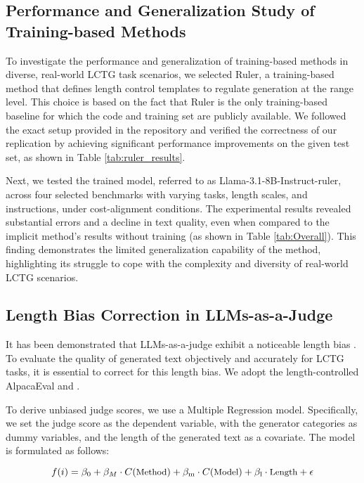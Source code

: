 \subsection{Performance and Generalization Study of Training-based Methods}
\label{sec:Training-based methods performance}
To investigate the performance and generalization of training-based methods in diverse, real-world LCTG task scenarios, we selected Ruler, a training-based method that defines length control templates to regulate generation at the range level. This choice is based on the fact that Ruler is the only training-based baseline for which the code and training set are publicly available. We followed the exact setup provided in the repository and verified the correctness of our replication by achieving significant performance improvements on the given test set, as shown in Table \ref{tab:ruler_results}.

Next, we tested the trained model, referred to as Llama-3.1-8B-Instruct-ruler, across four selected benchmarks with varying tasks, length scales, and instructions, under cost-alignment conditions. The experimental results revealed substantial errors and a decline in text quality, even when compared to the implicit method's results without training (as shown in Table \ref{tab:Overall}). This finding demonstrates the limited generalization capability of the method, highlighting its struggle to cope with the complexity and diversity of real-world LCTG scenarios.


\subsection{Length Bias Correction in LLMs-as-a-Judge}

It has been demonstrated that LLMs-as-a-judge exhibit a noticeable length bias \citep{li2024generation, gu2024survey}. To evaluate the quality of generated text objectively and accurately for LCTG tasks, it is essential to correct for this length bias. We adopt the length-controlled AlpacaEval \citep{dubois2024length} and \citet{yuan2025llm}.

To derive unbiased judge scores, we use a Multiple Regression model. Specifically, we set the judge score as the dependent variable, with the generator categories as dummy variables, and the length of the generated text as a covariate. The model is formulated as follows:

\begin{equation}
\small
f(i) = \beta_0 + \beta_{M} \cdot C(\text{Method}) + \beta_{\text{m}} \cdot C(\text{Model}) + \beta_{\text{l}} \cdot \text{Length} + \epsilon
\label{equation: bias}
\end{equation}

